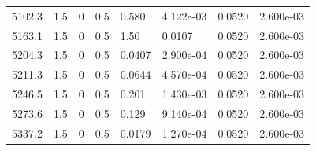 \documentclass[preview]{standalone}
\begin{document}
{{{{\begin{tabular}{L{1.2cm}C{1.2cm} C{0.3cm}C{0.5cm} C{1.4cm}C{1.4cm} C{1.4cm}C{1.4cm}}
  5102.3  &   1.5  & 0     & 0.5 &  0.580  & 4.122e-03  & 0.0520 &  2.600e-03   \\ 
  5163.1  &   1.5  & 0     & 0.5 &  1.50  & 0.0107  & 0.0520 &  2.600e-03   \\ 
  5204.3  &   1.5  & 0     & 0.5 &  0.0407  & 2.900e-04  & 0.0520 &  2.600e-03   \\ 
  5211.3  &   1.5  & 0     & 0.5 &  0.0644  & 4.570e-04  & 0.0520 &  2.600e-03   \\ 
  5246.5  &   1.5  & 0     & 0.5 &  0.201  & 1.430e-03  & 0.0520 &  2.600e-03   \\ 
  5273.6  &   1.5  & 0     & 0.5 &  0.129  & 9.140e-04  & 0.0520 &  2.600e-03   \\ 
  5337.2  &   1.5  & 0     & 0.5 &  0.0179  & 1.270e-04  & 0.0520 &  2.600e-03   \\ 
\hline 
\end{tabular} 

}}}}
\end{document}
